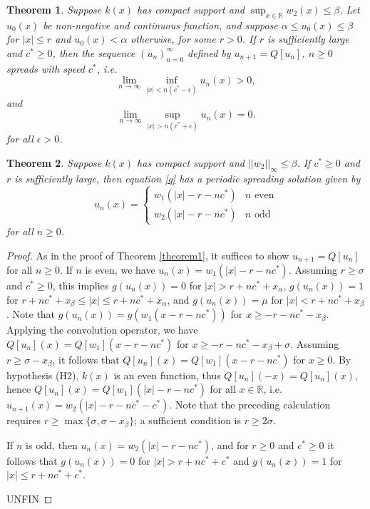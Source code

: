 \documentclass[11pt]{article}
\newtheorem{thm}{Theorem}
\theoremstyle{definition}
\numberwithin{equation}{section}
\numberwithin{thm}{section}
\renewcommand{\a}{\alpha}
\renewcommand{\b}{\beta}
\newcommand{\m}{\mu}
\begin{document}
\begin{thm} Suppose $k(x)$ has compact support and $\sup_{x\in\mathbb R}w_2(x)\leq \b$. Let $u_0(x)$ be non-negative and continuous function, and suppose $\a \leq u_0(x) \leq \b$ for $|x| \leq r$ and $u_0(x) < \a$ otherwise, for some $r > 0$. If $r$ is sufficiently large and $c^* \geq 0$, then the sequence $(u_n)_{n=0}^{\infty}$ defined by $u_{n+1}=Q[u_n]$, $n\geq 0$ spreads with speed $c^*$, i.e.
\begin{equation}
\lim_{n\to\infty}\inf_{|x|<n(c^*-\epsilon)}u_{n}(x)>0,
\end{equation}
and 
\begin{equation}
\lim_{n\to\infty}\sup_{|x|>n(c^*+\epsilon)}u_n(x)=0.
\end{equation}
for all $\epsilon>0$.
\end{thm}

\begin{thm} Suppose $k(x)$ has compact support and $||w_2||_\infty \leq \b$. If $c^* \geq 0$ and $r$ is sufficiently large, then equation \eqref{q} has a periodic spreading solution given by
\begin{equation} \label{compactptw}
u_n(x) = \begin{cases}
w_1(|x|-r-nc^*) & n \text{ even} \\
w_2(|x|-r-nc^*) & n \text{ odd}
\end{cases}
\end{equation}
for all $n\geq 0$.
\end{thm}

\begin{proof}
As in the proof of Theorem \ref{theorem1}, it suffices to show $u_{n+1}=Q[u_n]$ for all $n\geq 0$. If $n$ is even, we have $u_n(x)=w_1(|x|-r-nc^*)$. Assuming $r \geq \sigma$ and $c^* \geq 0$, this implies $g(u_n(x)) = 0$ for $|x| > r+nc^*+x_\a$, $g(u_n(x))=1$ for $r+nc^*+x_\b\leq |x|\leq r+nc^*+x_\a$, and $g(u_n(x))=\m$ for $|x|<r+nc^*+x_\b$. Note that $g(u_n(x)) = g(w_1(x-r-nc^*))$ for $x \geq -r-nc^*-x_\b$. Applying the convolution operator, we have $Q[u_n](x) = Q[w_1](x-r-nc^*)$ for $x \geq -r-nc^*-x_\b+\sigma$. Assuming $r \geq \sigma - x_\b$, it follows that $Q[u_n](x) = Q[w_1](x-r-nc^*)$ for $x \geq 0$. By hypothesis (H2), $k(x)$ is an even function, thus $Q[u_n](-x) = Q[u_n](x)$, hence $Q[u_n](x) = Q[w_1](|x|-r-nc^*)$ for all $x \in \mathbb R$, i.e. $u_{n+1}(x) = w_2(|x|-r-nc^*-c^*)$. Note that the preceding calculation requires $r \geq \max\{\sigma,\sigma-x_\b\}$; a sufficient condition is $r \geq 2\sigma$.

If $n$ is odd, then $u_n(x)=w_2(|x|-r-nc^*)$, and for $r\geq0$ and $c^*\geq 0$ it follows that $g(u_n(x)) = 0$ for $|x| > r+nc^*+c^*$ and $g(u_n(x))=1$ for $|x| \leq r+nc^*+c^*$.

UNFIN
\end{proof}
\end{document}
